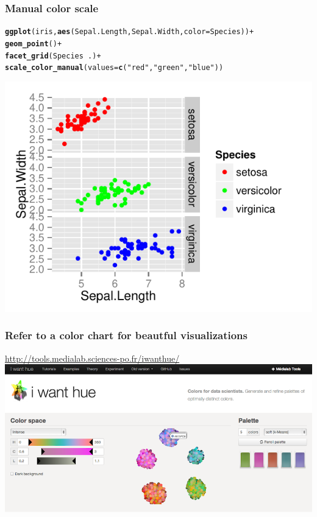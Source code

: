\documentclass{beamer}\usepackage[]{graphicx}\usepackage[]{color}
\makeatletter
\newcommand{\hlstr}[1]{\textcolor[rgb]{0.192,0.494,0.8}{#1}}%
\newcommand{\hlopt}[1]{\textcolor[rgb]{0,0,0}{#1}}%
\newcommand{\hlstd}[1]{\textcolor[rgb]{0.345,0.345,0.345}{#1}}%
\newcommand{\hlkwc}[1]{\textcolor[rgb]{0.333,0.667,0.333}{#1}}%
\newcommand{\hlkwd}[1]{\textcolor[rgb]{0.737,0.353,0.396}{\textbf{#1}}}%
\newenvironment{kframe}{%
 \def\at@end@of@kframe{}%
 \ifinner\ifhmode%
  \def\at@end@of@kframe{\end{minipage}}%
  \begin{minipage}{\columnwidth}%
 \fi\fi%
 \def\FrameCommand##1{\hskip\@totalleftmargin \hskip-\fboxsep
 \colorbox{shadecolor}{##1}\hskip-\fboxsep
     \hskip-\linewidth \hskip-\@totalleftmargin \hskip\columnwidth}%
 \MakeFramed {\advance\hsize-\width
   \@totalleftmargin\z@ \linewidth\hsize
   \@setminipage}}%
 {\par\unskip\endMakeFramed%
 \at@end@of@kframe}
\newenvironment{knitrout}{}{} %
\makeatother
\begin{document}
\begin{frame}[fragile]
\frametitle{Manual color scale}
\begin{knitrout}\footnotesize
{}\color{fgcolor}\begin{kframe}
\begin{alltt}
\hlkwd{ggplot}\hlstd{(iris,} \hlkwd{aes}\hlstd{(Sepal.Length, Sepal.Width,} \hlkwc{color} \hlstd{= Species))} \hlopt{+}
\hlkwd{geom_point}\hlstd{()} \hlopt{+}
\hlkwd{facet_grid}\hlstd{(Species} \hlopt{~} \hlstd{.)} \hlopt{+}
\hlkwd{scale_color_manual}\hlstd{(}\hlkwc{values} \hlstd{=} \hlkwd{c}\hlstd{(}\hlstr{"red"}\hlstd{,} \hlstr{"green"}\hlstd{,} \hlstr{"blue"}\hlstd{))}
\end{alltt}
\end{kframe}

{\centering \includegraphics[width=.75\linewidth]{figure/facetgridcolors} 

}



\end{knitrout}
\end{frame}


\begin{frame}[fragile]
\frametitle{Refer to a color chart for beautful visualizations}
\begin{center}
\url{http://tools.medialab.sciences-po.fr/iwanthue/}
\newline
\newline
\includegraphics[scale=0.25]{images/color_schemes.png}
\end{center}
\end{frame}
\end{document}
